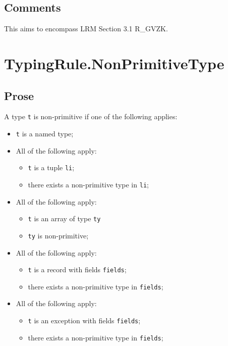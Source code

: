 \documentclass{book}
\begin{document}
    \subsection{Comments}
    This aims to encompass LRM Section 3.1 R\_GVZK.

\section{TypingRule.NonPrimitiveType}

    \subsection{Prose} 
    A type \texttt{t} is non-primitive if one of the following applies:
    \begin{itemize}
    \item \texttt{t} is a named type;
    \item All of the following apply:
      \begin{itemize}
      \item \texttt{t} is a tuple \texttt{li};
      \item there exists a non-primitive type in \texttt{li};
      \end{itemize}
    \item All of the following apply:
      \begin{itemize}
      \item \texttt{t} is an array of type \texttt{ty}
      \item \texttt{ty} is non-primitive; 
      \end{itemize}
    \item All of the following apply:
      \begin{itemize}
      \item \texttt{t} is a record with fields \texttt{fields};
      \item there exists a non-primitive type in \texttt{fields};
      \end{itemize}
    \item All of the following apply:
      \begin{itemize}
      \item \texttt{t} is an exception with fields \texttt{fields};
      \item there exists a non-primitive type in \texttt{fields};
      \end{itemize}
    \end{itemize}
\end{document}

